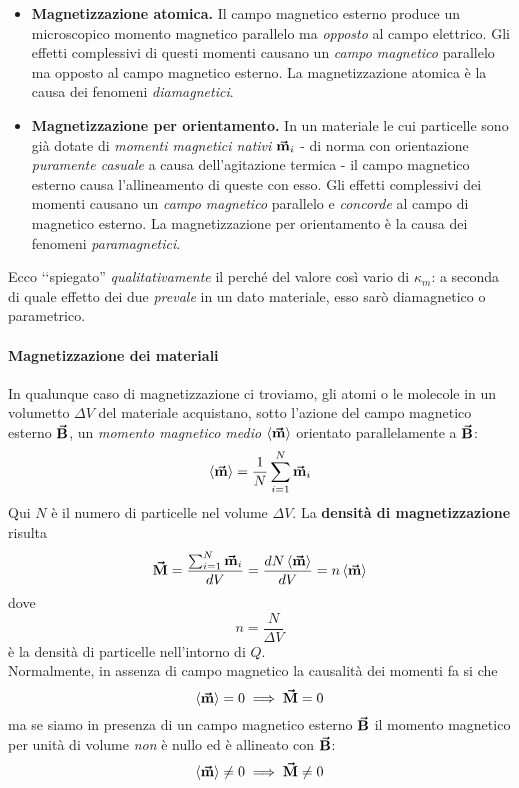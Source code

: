 \begin{itemize}
	\item \textbf{Magnetizzazione atomica.} Il campo magnetico esterno produce un microscopico momento magnetico parallelo ma \textit{opposto} al campo elettrico. Gli effetti complessivi di questi momenti causano un \textit{campo magnetico} parallelo ma opposto al campo magnetico esterno. La magnetizzazione atomica è la causa dei fenomeni \textit{diamagnetici}. %
	\item \textbf{Magnetizzazione per orientamento.} In un materiale le cui particelle sono già dotate di \textit{momenti magnetici nativi} $\vb*{\va{m}}_i$ - di norma con orientazione \textit{puramente casuale} a causa dell'agitazione termica - il campo magnetico esterno causa l'allineamento di queste con esso. Gli effetti complessivi dei momenti causano un \textit{campo magnetico} parallelo e \textit{concorde} al campo di magnetico esterno. La magnetizzazione per orientamento è la causa dei fenomeni \textit{paramagnetici}.
\end{itemize}
Ecco ‘‘spiegato'' \textit{qualitativamente} il perché del valore così vario di $\kappa_m$: a seconda di quale effetto dei due \textit{prevale} in un dato materiale, esso sarò diamagnetico o parametrico.
\paragraph{Magnetizzazione dei materiali}
In qualunque caso di magnetizzazione ci troviamo, gli atomi o le molecole in un volumetto $\Delta V$ del materiale acquistano, sotto l'azione del campo magnetico esterno $\vb*{\va{B}}$, un \textit{momento magnetico medio} $\left<\vb*{\va{m}}\right>$ orientato parallelamente a $\vb*{\va{B}}$:
\begin{equation}
	\left<\vb*{\va{m}}\right>=\frac{1}{N}\sum_{i=1}^{N}\vb*{\va{m}}_i
\end{equation}
Qui $N$ è il numero di particelle nel volume $\Delta V$. La \textbf{densità di magnetizzazione} risulta
\begin{equation}
	\vb*{\va{M}}=\frac{\sum_{i=1}^{N}\vb*{\va{m}}_i}{dV}=\frac{dN\left<\vb*{\va{m}}\right>}{dV}=n\left<\vb*{\va{m}}\right>
\end{equation}
dove
\begin{equation*}
	n=\frac{N}{\Delta V}
\end{equation*}
è la densità di particelle nell'intorno di $Q$.\\
Normalmente, in assenza di campo magnetico la causalità dei momenti fa si che
\begin{equation*}
	\left<\vb*{\va{m}}\right>=0\implies \vb*{\va{M}}=0
\end{equation*}
ma se siamo in presenza di un campo magnetico esterno $\vb*{\va{B}}$ il momento magnetico per unità di volume \textit{non} è nullo ed è allineato con $\vb*{\va{B}}$:
\begin{equation*}
	\left<\vb*{\va{m}}\right>\neq 0\implies \vb*{\va{M}}\neq 0
\end{equation*}
